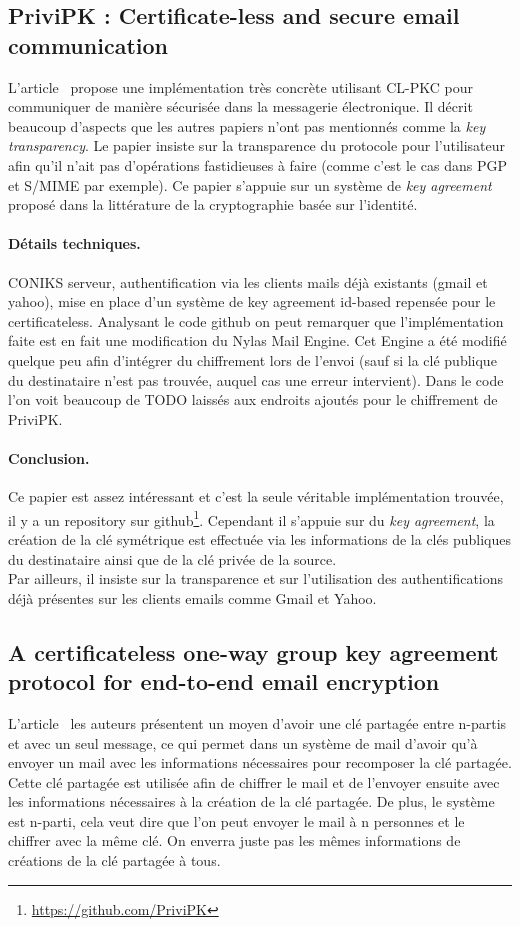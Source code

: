 \subsection{PriviPK : Certificate-less and secure email communication}
L'article~\cite{DBLP:journals/compsec/AlSabahTLSD17} propose une implémentation très concrète utilisant CL-PKC pour communiquer de manière sécurisée dans la messagerie électronique. Il décrit beaucoup d'aspects que les autres papiers n'ont pas mentionnés comme la \textit{key transparency}. Le papier insiste sur la transparence du protocole pour l'utilisateur afin qu'il n'ait pas d'opérations fastidieuses à faire (comme c'est le cas dans PGP et S/MIME par exemple). Ce papier s'appuie sur un système de \textit{key agreement} proposé dans la littérature de la cryptographie basée sur l'identité.

\paragraph*{Détails techniques.} CONIKS serveur, authentification via les clients mails déjà existants (gmail et yahoo), mise en place d'un système de key agreement id-based repensée pour le certificateless. Analysant le code github on peut remarquer que l'implémentation faite est en fait une modification du Nylas Mail Engine. Cet Engine a été modifié quelque peu afin d'intégrer du chiffrement lors de l'envoi (sauf si la clé publique du destinataire n'est pas trouvée, auquel cas une erreur intervient). Dans le code l'on voit beaucoup de TODO laissés aux endroits ajoutés pour le chiffrement de PriviPK. 

\paragraph*{Conclusion.} Ce papier est assez intéressant et c'est la seule véritable implémentation trouvée, il y a un repository sur github\footnote{\url{https://github.com/PriviPK}}. Cependant il s'appuie sur du \textit{key agreement}, la création de la clé symétrique est effectuée via les informations de la clés publiques du destinataire ainsi que de la clé privée de la source.\\
Par ailleurs, il insiste sur la transparence et sur l'utilisation des authentifications déjà présentes sur les clients emails comme Gmail et Yahoo.

\subsection{A certificateless one-way group key agreement protocol for end-to-end email encryption}
L'article~\cite{DBLP:conf/prdc/YehSDSSW18} les auteurs présentent un moyen d'avoir une clé partagée entre n-partis et avec un seul message, ce qui permet dans un système de mail d'avoir qu'à envoyer un mail avec les informations nécessaires pour recomposer la clé partagée. Cette clé partagée est utilisée afin de chiffrer le mail et de l'envoyer ensuite avec les informations nécessaires à la création de la clé partagée. De plus, le système est n-parti, cela veut dire que l'on peut envoyer le mail à n personnes et le chiffrer avec la même clé. On enverra juste pas les mêmes informations de créations de la clé partagée à tous.

